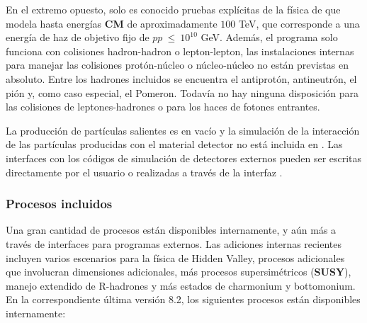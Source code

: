 En el extremo opuesto, solo es conocido pruebas explícitas de la física de  que modela hasta energías \textbf{CM} de aproximadamente $100$ TeV, que corresponde a una energía de haz de objetivo fijo de $pp~\leq~10^{10}$ GeV. Además, el programa solo funciona con colisiones hadron-hadron o lepton-lepton, las instalaciones internas para manejar las colisiones protón-núcleo o núcleo-núcleo no están previstas en absoluto. Entre los hadrones incluidos se encuentra el antiprotón, antineutrón, el pión y, como caso especial, el Pomeron. Todavía no hay ninguna disposición para las colisiones de leptones-hadrones o para los haces de fotones entrantes.

La producción de partículas salientes es en vacío y la simulación de la interacción de las partículas producidas con el material detector no está incluida en . Las interfaces con los códigos de simulación de detectores externos pueden ser escritas directamente por el usuario o realizadas a través de la interfaz .

\subsubsection{Procesos incluidos}

Una gran cantidad de procesos están disponibles internamente, y aún más a través de interfaces para programas externos. Las adiciones internas recientes incluyen varios escenarios para la física de Hidden Valley, procesos adicionales que involucran dimensiones adicionales, más procesos supersimétricos (\textbf{SUSY}), manejo extendido de R-hadrones y más estados de charmonium y bottomonium. En la correspondiente última versión 8.2, los siguientes procesos están disponibles internamente:

